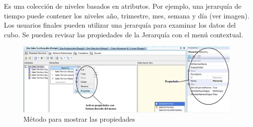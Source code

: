 \documentclass[11pt,a4paper]{article}
\begin{document}
	 	Es una colección de niveles basados en atributos. Por ejemplo, una jerarquía de tiempo puede contener los niveles año, trimestre, mes, semana y día (ver imagen). Los usuarios finales pueden utilizar una jerarquía para examinar los datos del cubo. Se pueden revisar las propiedades de la Jerarquía con el menú contextual.			
	 	\begin{figure}[H]
	 		\begin{center}
	 			\includegraphics[scale=0.75]{./Imagenes/img03}	
	 			\caption{Método para mostrar las propiedades}	
	 		\end{center}
	 	\end{figure}
	 	\newpage
			
		
	 
	
	
	
	
\end{document}
